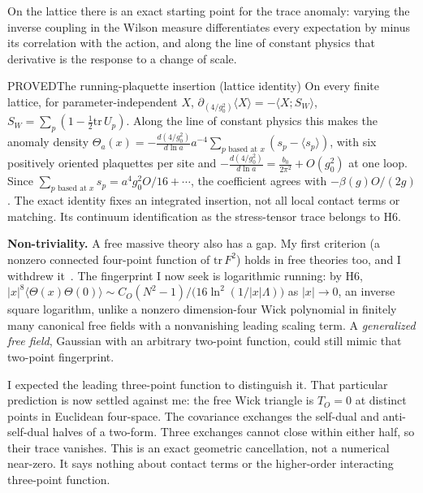 On the lattice there is an exact starting point for the trace anomaly: varying the inverse coupling in the Wilson measure
differentiates every expectation by minus its correlation with the action, and along the line of constant physics that
derivative is the response to a change of scale.

\begin{claim}{PROVED}{The running-plaquette insertion (lattice identity)}\label{b:anomaly}
On every finite lattice, for parameter-independent $X$, $\partial_{(4/g_0^2)}\langle X\rangle=-\langle X;S_W\rangle$,
$S_W=\sum_p(1-\tfrac12\mathrm{tr}\,U_p)$.
Along the line of constant physics this makes the anomaly density $\Theta_a(x)=-\frac{d(4/g_0^2)}{d\ln a}a^{-4}
\sum_{p\text{ based at }x}(s_p-\langle s_p\rangle)$, with six positively oriented plaquettes per site and
$-\frac{d(4/g_0^2)}{d\ln a}=\frac{b_0}{2\pi^2}+O(g_0^2)$ at one loop. Since
$\sum_{p\text{ based at }x}s_p=a^4g_0^2O/16+\cdots$, the coefficient agrees with $-\beta(g)O/(2g)$.
The exact identity fixes an integrated insertion, not all local contact terms or matching. Its continuum
identification as the stress-tensor trace belongs to H6.
\end{claim}

\textbf{Non-triviality.} A free massive theory also has a gap. My first criterion (a nonzero connected four-point function of
$\mathrm{tr}\,F^2$) holds in free theories too, and I withdrew it~\cite{ClosedSet}. The fingerprint I now seek is logarithmic
running: by H6, $|x|^8\langle\Theta(x)\Theta(0)\rangle\sim C_O(N^2-1)/\bigl(16\ln^2(1/|x|\Lambda)\bigr)$ as
$|x|\to0$, an inverse square logarithm, unlike a nonzero dimension-four Wick polynomial in finitely many canonical
free fields with a nonvanishing leading scaling term. A \emph{generalized free field}, Gaussian with an arbitrary
two-point function, could still mimic that two-point fingerprint.

I expected the leading three-point function to distinguish it. That particular prediction is now settled against
me: the free Wick triangle is $T_O=0$ at distinct points in Euclidean four-space. The covariance exchanges the
self-dual and anti-self-dual halves of a two-form. Three exchanges cannot close within either half, so their
trace vanishes. This is an exact geometric cancellation, not a numerical near-zero. It says nothing about
contact terms or the higher-order interacting three-point function.

